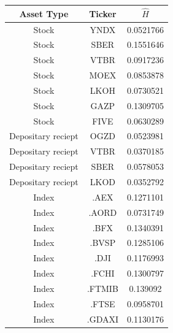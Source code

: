         \begin{table}[htbp]
            \centering
            \begin{tabular}{|c|c|c|}
                \hline
                Asset Type               & Ticker & $\hat H$  \\ \hline
                \hline
                Stock                    & YNDX   & 0.0521766 \\ \hline
                Stock                    & SBER   & 0.1551646 \\ \hline
                Stock                    & VTBR   & 0.0917236 \\ \hline
                Stock                    & MOEX   & 0.0853878 \\ \hline
                Stock                    & LKOH   & 0.0730521 \\ \hline
                Stock                    & GAZP   & 0.1309705 \\ \hline
                Stock                    & FIVE   & 0.0630289 \\ \hline
                \hline
                Depositary reciept       & OGZD   & 0.0523981 \\ \hline
                Depositary reciept       & VTBR   & 0.0370185 \\ \hline
                Depositary reciept       & SBER   & 0.0578053 \\ \hline
                Depositary reciept       & LKOD   & 0.0352792 \\ \hline
                \hline
                Index                    & .AEX & 0.1271101 \\ \hline
                Index                    & .AORD & 0.0731749 \\ \hline
                Index                    & .BFX & 0.1340391 \\ \hline
                Index                    & .BVSP & 0.1285106 \\ \hline
                Index                    & .DJI & 0.1176993 \\ \hline
                Index                    & .FCHI & 0.1300797 \\ \hline
                Index                    & .FTMIB & 0.139092 \\ \hline
                Index                    & .FTSE & 0.0958701 \\ \hline
                Index                    & .GDAXI & 0.1130176 \\ \hline

\end{tabular}
\end{table}
